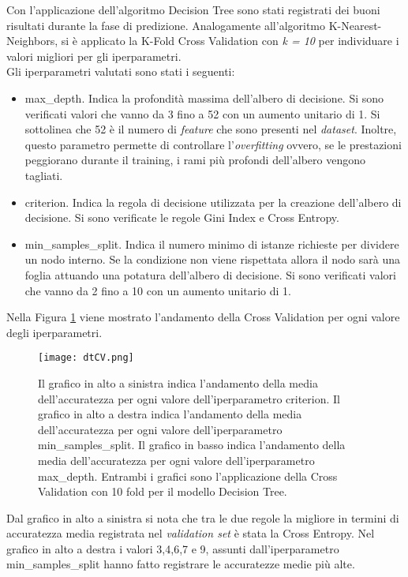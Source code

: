 Con l'applicazione dell'algoritmo Decision Tree sono stati registrati dei buoni risultati durante la fase di predizione. Analogamente all'algoritmo K-Nearest-Neighbors, si è applicato la K-Fold Cross Validation con \emph{k = 10} per individuare i valori migliori per gli iperparametri.\\
Gli iperparametri valutati sono stati i seguenti:
\begin{itemize}
	\item \textsf{max\_depth}. Indica la profondità massima dell'albero di decisione. Si sono verificati valori che vanno da 3 fino a 52 con un aumento unitario di 1. Si sottolinea che 52 è il numero di \emph{feature} che sono presenti nel \emph{dataset}. Inoltre, questo parametro permette di controllare l'\emph{overfitting} ovvero, se le prestazioni peggiorano durante il training, i rami più profondi dell'albero vengono tagliati.
	\item \textsf{criterion}. Indica la regola di decisione utilizzata per la creazione dell'albero di decisione. Si sono verificate le regole Gini Index e Cross Entropy.
	\item \textsf{min\_samples\_split}. Indica il numero minimo di istanze richieste per dividere un nodo interno. Se la condizione non viene rispettata allora il nodo sarà una foglia attuando una potatura dell'albero di decisione. Si sono verificati valori che vanno da 2 fino a 10 con un aumento unitario di 1.
\end{itemize}
Nella Figura \ref{fig:dtCV}  viene mostrato l'andamento della Cross Validation per ogni valore degli iperparametri.
\begin{figure}[h]
	\begin{center}
		\texttt{[image: dtCV.png]}
		\caption{Il grafico in alto a sinistra indica l'andamento della media dell'accuratezza per ogni valore dell'iperparametro \textsf{criterion}. Il grafico in alto a destra indica l'andamento della media dell'accuratezza per ogni valore dell'iperparametro \textsf{min\_samples\_split}. Il grafico in basso indica l'andamento della media dell'accuratezza per ogni valore dell'iperparametro \textsf{max\_depth}. Entrambi i grafici sono l'applicazione della Cross Validation con 10 fold per il modello Decision Tree. 
		} 
		\label{fig:dtCV}
	\end{center}
\end{figure}
Dal grafico in alto a sinistra si nota che tra le due regole la migliore in termini di accuratezza media registrata nel \emph{validation set} è stata la Cross Entropy. Nel grafico in alto a destra i valori 3,4,6,7 e 9, assunti dall'iperparametro \textsf{min\_samples\_split} hanno fatto registrare le accuratezze medie più alte.\\
